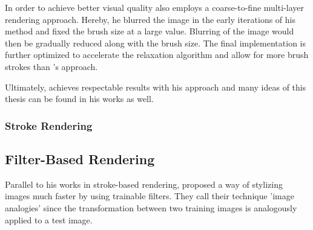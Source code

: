 In order to achieve better visual quality \citeauthor*{Hertzmann} also employs a coarse-to-fine multi-layer rendering approach.
Hereby, he blurred the image in the early iterations of his method and fixed the brush size at a large value.
Blurring of the image would then be gradually reduced along with the brush size.
The final implementation is further optimized to accelerate the relaxation algorithm and allow for more brush strokes than \citeauthor*{paintbynumbers}'s approach.

Ultimately, \citeauthor*{Hertzmann} achieves respectable results with his approach and many ideas of this thesis can be found in his works as well.

\subsubsection{Stroke Rendering}






\subsection{Filter-Based Rendering}
Parallel to his works in stroke-based rendering, \citeauthor*{imageanalogies} proposed a way of stylizing images much faster by using trainable filters.
They call their technique 'image analogies' since the transformation between two training images is analogously applied to a test image.

